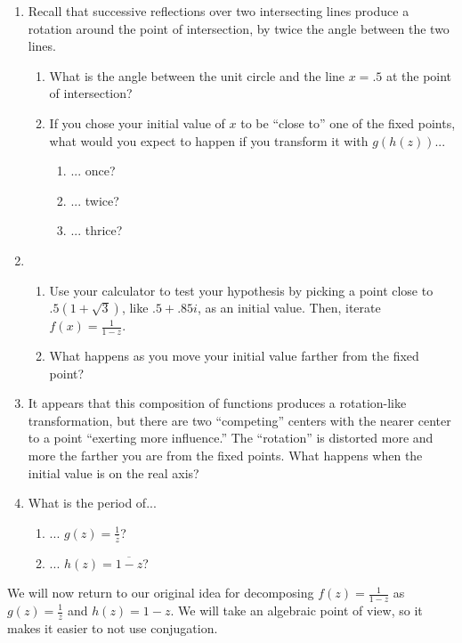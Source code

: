 \documentclass[../gatm_answers.tex]{subfiles}
\begin{document}
\begin{enumerate}
\setcounter{enumi}{\value{problem_i}}
\item Recall that successive reflections over two intersecting lines produce a rotation around the point of intersection, by twice the angle between the two lines.
\begin{enumerate}
\item What is the angle between the unit circle and the line $x=.5$ at the point of intersection?
\item If you chose your initial value of $x$ to be ``close to'' one of the fixed points, what would you expect to happen if you transform it with $g(h(z))$...
\begin{multicols}{3}
\begin{enumerate}
\item ... once?
\item ... twice?
\item ... thrice?
\end{enumerate}
\end{multicols}
\end{enumerate}
\item \begin{enumerate}
\item Use your calculator to test your hypothesis by picking a point close to $.5(1+\sqrt{3})$, like $.5+.85i$, as an initial value. Then, iterate $f(x)=\frac{1}{1-z}$.
\item What happens as you move your initial value farther from the fixed point?
\end{enumerate}
\item It appears that this composition of functions produces a rotation-like transformation, but there are two ``competing'' centers with the nearer center to a point ``exerting more influence.'' The ``rotation'' is distorted more and more the farther you are from the fixed points. What happens when the initial value is on the real axis?
\item What is the period of...
\begin{enumerate}
\item ... $g(z)=\frac{1}{\overline{z}}$?
\item ... $h(z)=\overline{1-z}$?
\end{enumerate}
\setcounter{problem_i}{\value{enumi}}
\end{enumerate}

We will now return to our original idea for decomposing $f(z)=\frac{1}{1-z}$ as $g(z)=\frac{1}{z}$ and $h(z)=1-z$. We will take an algebraic point of view, so it makes it easier to not use conjugation.
\end{document}
